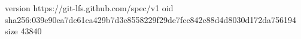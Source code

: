 version https://git-lfs.github.com/spec/v1
oid sha256:039e90ea7de61ca429b7d3e8558229f29de7fcc842c88d4d8030d172da756194
size 43840
